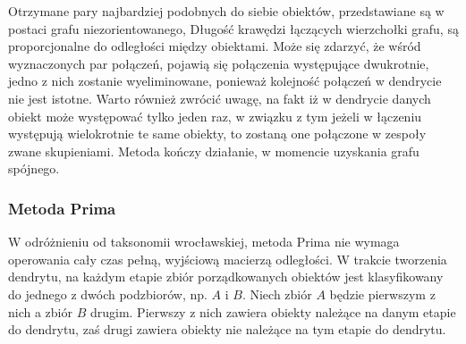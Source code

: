 \documentclass[12pt,a4paper]{report}
\begin{document}
Otrzymane pary najbardziej podobnych do siebie obiektów, przedstawiane są w postaci grafu niezorientowanego, Długość krawędzi łączących wierzchołki grafu, są proporcjonalne do odległości między obiektami. Może się zdarzyć, że wśród wyznaczonych par połączeń, pojawią się połączenia występujące dwukrotnie, jedno z nich zostanie wyeliminowane, ponieważ kolejność połączeń w dendrycie nie jest istotne. Warto również zwrócić uwagę, na fakt iż w dendrycie danych obiekt może występować tylko jeden raz, w związku z tym jeżeli w łączeniu występują wielokrotnie te same obiekty, to zostaną one połączone w zespoły zwane skupieniami. Metoda kończy działanie, w momencie uzyskania grafu spójnego.



\subsubsection{Metoda Prima}
\noindent

W odróżnieniu od taksonomii wrocławskiej, metoda Prima nie wymaga operowania cały czas pełną, wyjściową macierzą odległości. W trakcie tworzenia dendrytu, na każdym etapie zbiór porządkowanych obiektów jest klasyfikowany do jednego z dwóch podzbiorów, np. $A$ i $B$. Niech zbiór $A$ będzie pierwszym z nich a zbiór $B$ drugim. Pierwszy z nich zawiera obiekty należące na danym etapie do dendrytu, zaś drugi zawiera obiekty nie należące na tym etapie do dendrytu.
\end{document}
